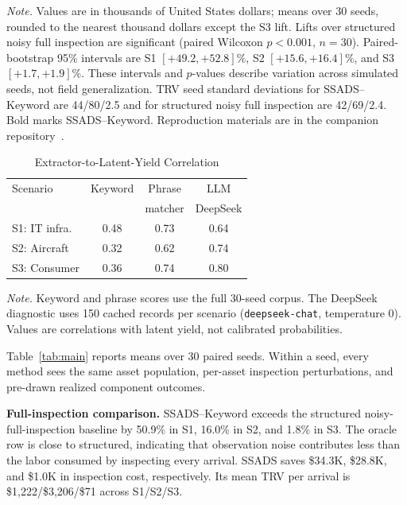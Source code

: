 \documentclass[a4paper,conference]{IEEEtran}
\begin{document}
\begin{table}[!t]
\par\smallskip
\begin{minipage}{\textwidth}
\footnotesize\raggedright\emph{Note.}
Values are in thousands of United States dollars; means over 30 seeds, rounded to
the nearest thousand dollars except the S3 lift. Lifts over structured noisy full
inspection are significant (paired Wilcoxon $p{<}0.001$, $n{=}30$).
Paired-bootstrap 95\% intervals are S1 $[+49.2,+52.8]\%$, S2
$[+15.6,+16.4]\%$, and S3 $[+1.7,+1.9]\%$. These intervals and $p$-values
describe variation across simulated seeds, not field generalization. TRV seed standard deviations for
SSADS--Keyword are 44/80/2.5 and for structured noisy full inspection are
42/69/2.4. Bold marks SSADS--Keyword.
Reproduction materials are in the companion repository~\cite{RLDBRepo}.
\end{minipage}
\end{table}

\begin{table}[!t]
\caption{Extractor-to-Latent-Yield Correlation}
\label{tab:calibration}
\centering
\footnotesize
\setlength{\tabcolsep}{4pt}
\begin{tabular*}{\columnwidth}{@{\extracolsep{\fill}}lccc@{}}
\toprule
Scenario & Keyword & Phrase & LLM \\
         &          & matcher & DeepSeek \\
\midrule
S1: IT infra.  & 0.48 & 0.73 & 0.64 \\
S2: Aircraft   & 0.32 & 0.62 & 0.74 \\
S3: Consumer   & 0.36 & 0.74 & 0.80 \\
\bottomrule
\end{tabular*}
\par\smallskip
\begin{minipage}{\columnwidth}
\footnotesize\raggedright\emph{Note.} Keyword and phrase scores use the full
30-seed corpus. The DeepSeek diagnostic uses 150 cached records per scenario
(\texttt{deepseek-chat}, temperature 0). Values are correlations with latent
yield, not calibrated probabilities.
\end{minipage}
\end{table}

Table~\ref{tab:main} reports means over 30 paired seeds. Within a seed, every
method sees the same asset population, per-asset inspection perturbations, and
pre-drawn realized component outcomes.

\smallskip\noindent\textbf{Full-inspection comparison.}
SSADS--Keyword exceeds the structured noisy-full-inspection baseline by 50.9\% in S1,
16.0\% in S2, and 1.8\% in S3. The oracle row is close to structured, indicating
that observation noise contributes less than the labor consumed by inspecting every
arrival. SSADS saves \$34.3K, \$28.8K, and \$1.0K in inspection cost, respectively.
Its mean TRV per arrival is \$1,222/\$3,206/\$71 across S1/S2/S3.
\end{document}
